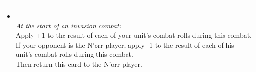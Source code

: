 \begin{multicols}{2}
\vspace{-10pt}\rule{\hsize}{0.4pt}\vspace{5pt}


\begin{itemize}
\item {}\\
\emph{At the start of an invasion combat:}\\
Apply +1 to the result of each of your unit's combat rolls during this combat. If your opponent is the N'orr player, apply -1 to the result of each of his unit's combat rolls during this combat.\\
Then return this card to the N'orr player.
\end{itemize}

\end{multicols}



